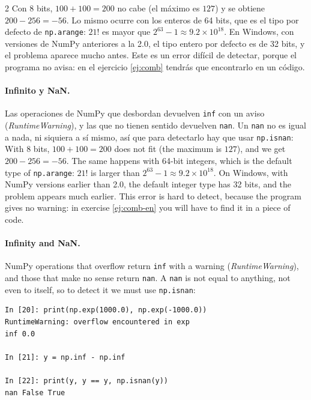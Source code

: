 \begin{paracol}{2}
Con 8 bits, $100+100=200$ no cabe (el máximo es $127$) y se obtiene $200-256=-56$. Lo mismo ocurre con los enteros de 64 bits, que es el tipo por defecto de \texttt{np.arange}: $21!$ es mayor que $2^{63}-1\approx 9.2\times 10^{18}$. En Windows, con versiones de NumPy anteriores a la 2.0, el tipo entero por defecto es de 32 bits, y el problema aparece mucho antes. Este es un error difícil de detectar, porque el programa no avisa: en el ejercicio \ref{ej:comb} tendrás que encontrarlo en un código.

\paragraph{Infinito y NaN.} Las operaciones de NumPy que desbordan devuelven \texttt{inf} con un aviso (\emph{RuntimeWarning}), y las que no tienen sentido devuelven \texttt{nan}. Un \texttt{nan} no es igual a nada, ni siquiera a sí mismo, así que para detectarlo hay que usar \texttt{np.isnan}:
\switchcolumn
With 8 bits, $100+100=200$ does not fit (the maximum is $127$), and we get $200-256=-56$. The same happens with 64-bit integers, which is the default type of \texttt{np.arange}: $21!$ is larger than $2^{63}-1\approx 9.2\times 10^{18}$. On Windows, with NumPy versions earlier than 2.0, the default integer type has 32 bits, and the problem appears much earlier. This error is hard to detect, because the program gives no warning: in exercise \ref{ej:comb-en} you will have to find it in a piece of code.

\paragraph{Infinity and NaN.} NumPy operations that overflow return \texttt{inf} with a warning (\emph{RuntimeWarning}), and those that make no sense return \texttt{nan}. A \texttt{nan} is not equal to anything, not even to itself, so to detect it we must use \texttt{np.isnan}:
\end{paracol}
\begin{verbatim}
In [20]: print(np.exp(1000.0), np.exp(-1000.0))
RuntimeWarning: overflow encountered in exp
inf 0.0

In [21]: y = np.inf - np.inf

In [22]: print(y, y == y, np.isnan(y))
nan False True
\end{verbatim}
